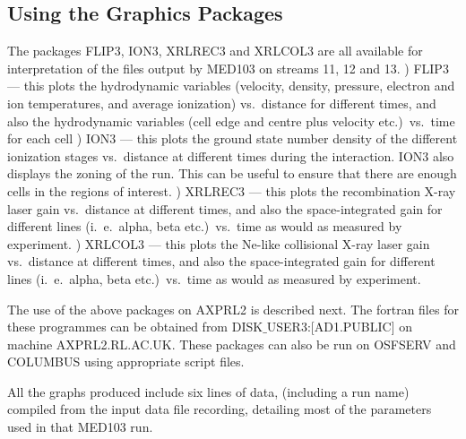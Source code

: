 \subsection{Using the Graphics Packages}
The packages FLIP3, ION3, XRLREC3 and XRLCOL3  are all available
for interpretation of the files output by MED103 on streams 11, 12 and 13.
) FLIP3 --- this plots the hydrodynamic variables (velocity,
density, pressure, electron and ion temperatures,
and average ionization) vs.\ distance
for different times, and also the hydrodynamic variables
(cell edge and centre plus velocity  etc.)\ vs.\ time
for each cell
) ION3 --- this plots the ground state number density
of the different ionization stages vs.\ distance at
different times during the interaction.
ION3 also displays the zoning of the run. This can be useful to
ensure that there are enough cells in the regions of interest.
) XRLREC3 --- this plots the recombination X-ray laser gain vs.\
distance at different
times, and also the space-integrated gain for different
lines (i.\ e.\ alpha, beta etc.)\ vs.\ time as would
as measured by experiment.
) XRLCOL3 --- this plots the Ne-like collisional X-ray laser gain vs.\
distance at different
times, and also the space-integrated gain for different
lines (i.\ e.\ alpha, beta etc.)\ vs.\ time as would
as measured by experiment.

The use of the above packages on AXPRL2 is described next.  
The fortran files for these programmes can be obtained from DISK$\_$USER3:[AD1.PUBLIC]
on machine AXPRL2.RL.AC.UK. These packages can also be run on OSFSERV and COLUMBUS using appropriate
script files.

 
All the graphs produced include six lines of data, (including
a run name) compiled from the input data file recording, detailing
most of the parameters used in that MED103 run.
 
